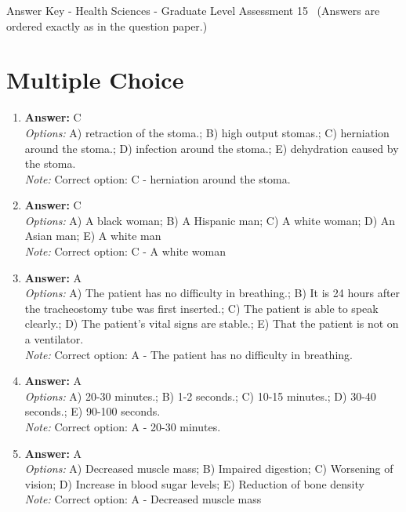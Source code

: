 \documentclass[12pt]{article}
\begin{document}
\begin{center}
Answer Key - Health Sciences - Graduate Level Assessment 15 \
\small (Answers are ordered exactly as in the question paper.)
\end{center}

\section*{Multiple Choice}
\begin{enumerate}[label=\arabic*.]
\item \textbf{Answer:} C
\\ \textit{Options:} A) retraction of the stoma.; B) high output stomas.; C) herniation around the stoma.; D) infection around the stoma.; E) dehydration caused by the stoma.
\\ \textit{Note:} Correct option: C - herniation around the stoma.
\item \textbf{Answer:} C
\\ \textit{Options:} A) A black woman; B) A Hispanic man; C) A white woman; D) An Asian man; E) A white man
\\ \textit{Note:} Correct option: C - A white woman
\item \textbf{Answer:} A
\\ \textit{Options:} A) The patient has no difficulty in breathing.; B) It is 24 hours after the tracheostomy tube was first inserted.; C) The patient is able to speak clearly.; D) The patient's vital signs are stable.; E) That the patient is not on a ventilator.
\\ \textit{Note:} Correct option: A - The patient has no difficulty in breathing.
\item \textbf{Answer:} A
\\ \textit{Options:} A) 20-30 minutes.; B) 1-2 seconds.; C) 10-15 minutes.; D) 30-40 seconds.; E) 90-100 seconds.
\\ \textit{Note:} Correct option: A - 20-30 minutes.
\item \textbf{Answer:} A
\\ \textit{Options:} A) Decreased muscle mass; B) Impaired digestion; C) Worsening of vision; D) Increase in blood sugar levels; E) Reduction of bone density
\\ \textit{Note:} Correct option: A - Decreased muscle mass
\end{enumerate}
\end{document}
